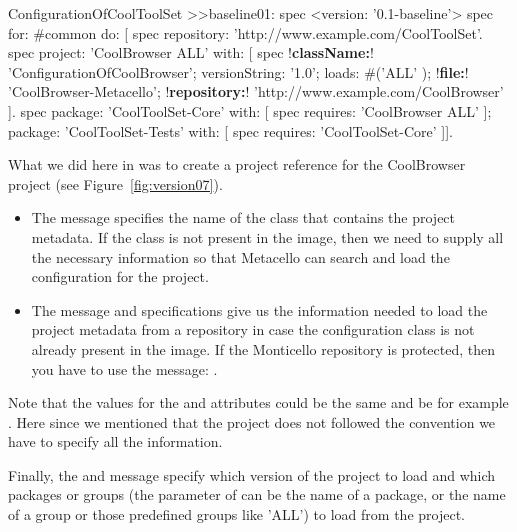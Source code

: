 \documentclass[a4paper,10pt,twoside]{book}
\begin{document}
\begin{code}{}
ConfigurationOfCoolToolSet >>baseline01: spec 
	<version: '0.1-baseline'>
	spec for: #common do: [
		spec repository: 'http://www.example.com/CoolToolSet'.
		spec project: 'CoolBrowser ALL' with: [
				spec 
				     !\textbf{className:}! 'ConfigurationOfCoolBrowser';
					versionString: '1.0';
					loads: #('ALL' );
					!\textbf{file:}! 'CoolBrowser-Metacello';
					!\textbf{repository:}! 'http://www.example.com/CoolBrowser' ].
		spec 
			package: 'CoolToolSet-Core' with: [ spec requires: 'CoolBrowser ALL' ];
			package: 'CoolToolSet-Tests' with: [ spec requires: 'CoolToolSet-Core' ]].
\end{code}	







What we did here in  was to create a project reference for the CoolBrowser project (see Figure~\ref{fig:version07}). 

\begin{itemize}
\item The message  specifies the name of the class that contains the project metadata. If the class is not present in the image, then we need to supply all the necessary information so that Metacello can search and load the configuration for the project.


\item The message  and  specifications give us the information needed to load the project metadata from a repository in case the configuration class is not already present in the image. If the Monticello repository is protected, then you have to use the message: .

\end{itemize}
Note that the values for the  and  attributes could be the same and be for example . Here since we mentioned that the project does not followed the convention we have to specify all the information. 

Finally, the  and  message specify which version of the project to load and which packages or groups (the parameter of  can be the name of a package, or the name of a group or those predefined groups like 'ALL') to load from the project. 
\end{document}
